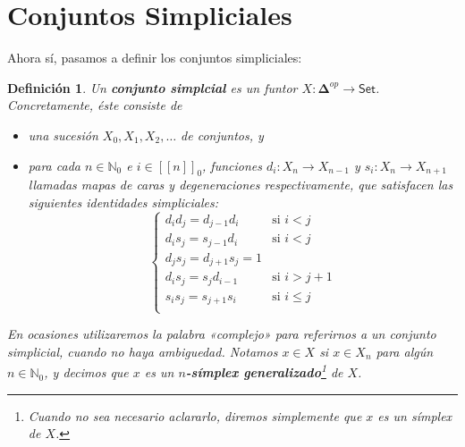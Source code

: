 \documentclass[11pt]{report}
\theoremstyle{colored}
\newtheorem{definition}{Definición}[section]
\newcommand{\N}{\mathbb{N}}
\newcommand{\nat}[1]{[\![#1]\!]}
\newcommand{\natzero}[1]{\nat{#1}_0}
\newcommand{\cat}[1]{\mathsf{#1}}
\newcommand{\ordcat}{\boldsymbol{\Delta}}
\newcommand{\guill}[1]{«#1»}
\begin{document}
\section{Conjuntos Simpliciales}

Ahora sí, pasamos a definir los conjuntos simpliciales:

\begin{definition} Un \textbf{conjunto simplcial} es un funtor $X : \ordcat^{op} \to \cat{Set}$. Concretamente, éste consiste de 
\begin{itemize}
\item[(i)] una sucesión $X_0,X_1,X_2, \dots$ de conjuntos, y \item[(ii)] para cada $n \in \N_0$ e $i \in \natzero{n}$, funciones 
$d_i : X_n \to X_{n-1}$ y $s_i : X_n \to X_{n+1}$ llamadas mapas de caras y degeneraciones respectivamente, que satisfacen las siguientes \textit{identidades simpliciales}:
\[
\begin{cases}
d_id_j = d_{j-1}d_i &\text{si $i < j$}\\
d_is_j = s_{j-1}d_i &\text{si $i < j$}\\
d_js_j = d_{j+1}s_j = 1\\
d_is_j = s_jd_{i-1} &\text{si $i > j+1$}\\
s_is_j = s_{j+1}s_i &\text{si $i \leq j$}\\
\end{cases}
\] 
\end{itemize}
En ocasiones utilizaremos la palabra \guill{complejo} para referirnos a un conjunto simplicial, cuando no haya ambiguedad. Notamos $x \in X$ si $x \in X_n$ para algún $n \in \N_0$, y decimos que $x$ es un \textbf{$n$-símplex generalizado}\footnote{Cuando no sea necesario aclararlo, diremos simplemente que $x$ es un símplex de $X$.} de $X$.\\
\end{definition}
\end{document}

